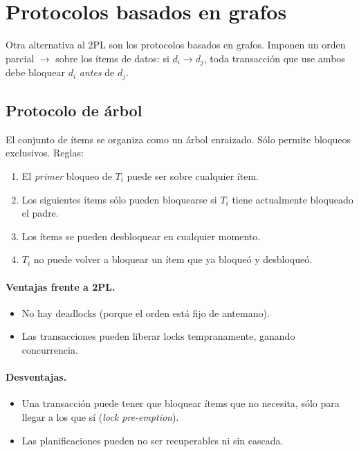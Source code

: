 \documentclass[11pt,a4paper]{article}
\begin{document}
\section{Protocolos basados en grafos}

Otra alternativa al 2PL son los protocolos basados en grafos. Imponen
un orden parcial $\rightarrow$ sobre los ítems de datos: si
$d_i \rightarrow d_j$, toda transacción que use ambos debe bloquear
$d_i$ \emph{antes} de $d_j$.

\subsection{Protocolo de árbol}

El conjunto de ítems se organiza como un árbol enraizado. Sólo permite
bloqueos exclusivos. Reglas:

\begin{enumerate}
    \item El \emph{primer} bloqueo de $T_i$ puede ser sobre cualquier ítem.
    \item Los siguientes ítems sólo pueden bloquearse si $T_i$ tiene
    actualmente bloqueado el padre.
    \item Los ítems se pueden desbloquear en cualquier momento.
    \item $T_i$ no puede volver a bloquear un ítem que ya bloqueó y
    desbloqueó.
\end{enumerate}

\paragraph{Ventajas frente a 2PL.}
\begin{itemize}
    \item No hay deadlocks (porque el orden está fijo de antemano).
    \item Las transacciones pueden liberar locks tempranamente, ganando
    concurrencia.
\end{itemize}

\paragraph{Desventajas.}
\begin{itemize}
    \item Una transacción puede tener que bloquear ítems que no necesita,
    sólo para llegar a los que sí (\emph{lock pre-emption}).
    \item Las planificaciones pueden no ser recuperables ni sin cascada.
\end{itemize}
\end{document}
